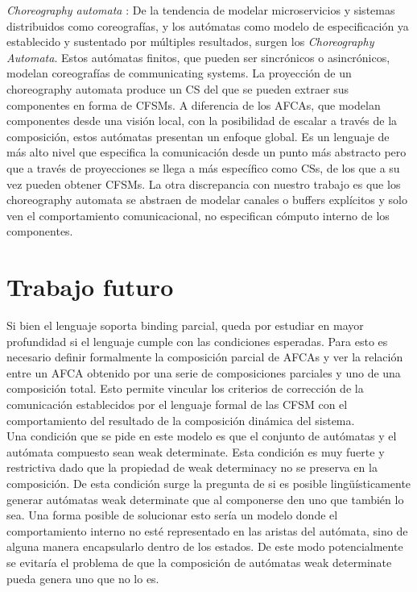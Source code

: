 \emph{Choreography automata} \cite{barbanera:coordination20}: De la tendencia de modelar microservicios y sistemas distribuidos como coreografías, y los autómatas como modelo de especificación ya establecido y sustentado por múltiples resultados, surgen los \emph{Choreography Automata}. Estos autómatas finitos, que pueden ser sincrónicos o asincrónicos, modelan coreografías de communicating systems. La proyección de un choreography automata produce un CS del que se pueden extraer sus componentes en forma de CFSMs. A diferencia de los AFCAs, que modelan componentes desde una visión local, con la posibilidad de escalar a través de la composición,  estos autómatas presentan un enfoque global. Es un lenguaje de más alto nivel que especifica la comunicación desde un punto más abstracto pero que a través de proyecciones se llega a más específico como CSs, de los que a su vez pueden obtener CFSMs. La otra discrepancia con nuestro trabajo es que los choreography automata se abstraen de modelar canales o buffers explícitos y solo ven el comportamiento comunicacional, no especifican cómputo interno de los componentes.

\section{Trabajo futuro}
Si bien el lenguaje soporta binding parcial, queda por estudiar en mayor profundidad si el lenguaje cumple con las condiciones esperadas. Para esto es necesario definir formalmente la composición parcial de AFCAs y ver la relación entre un AFCA obtenido por una serie de composiciones parciales y uno de una composición total. Esto permite vincular los criterios de corrección de la comunicación establecidos por el lenguaje formal de las CFSM con el comportamiento del resultado de la composición dinámica del sistema. \\
Una condición que se pide en este modelo es que el conjunto de autómatas y el autómata compuesto sean weak determinate. Esta condición es muy fuerte y restrictiva dado que la propiedad de weak determinacy no se preserva en la composición. De esta condición surge la pregunta de si es posible lingüísticamente generar autómatas weak determinate que al componerse den uno que también lo sea. Una forma posible de solucionar esto sería un modelo donde el comportamiento interno no esté representado en las aristas del autómata, sino de alguna manera encapsularlo dentro de los estados. De este modo potencialmente se evitaría el problema de que la composición de autómatas weak determinate pueda genera uno que no lo es.


